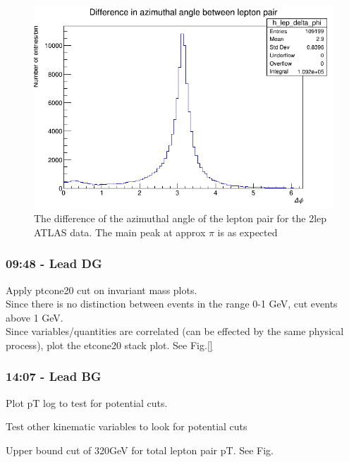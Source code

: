 \begin{figure}[h!]
    \centering
    \includegraphics[width=0.85\linewidth]{plots/23-02-2021/2lep_delta-phi_0-7_23-02_09-43.png}
    \caption{The difference of the azimuthal angle of the lepton pair for the 2lep ATLAS data.  The main peak at approx $\pi$ is as expected}\label{fig:23-02_09-43}
\end{figure}

\subsubsection*{09:48 - Lead DG}
Apply ptcone20 cut on invariant mass plots.
\\
Since there is no distinction between events in the range 0-1 GeV, cut events above 1 GeV.
\\
Since variables/quantities are correlated (can be effected by the same physical process), plot the etcone20 stack plot.   See Fig.\ref{}

\subsubsection*{14:07 - Lead BG}
Plot pT log to test for potential cuts.

Test other kinematic variables to look for potential cuts

Upper bound cut of 320GeV for total lepton pair pT.  See Fig.{}

